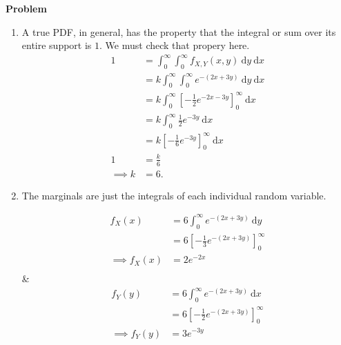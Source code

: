 \documentclass[12pt]{article}
\newenvironment{Ex}{\textbf{Problem}\vspace{.75em}\\}{}
\newcommand{\dd}[1]{\:\mathrm{d}{#1}}
\begin{document}
\begin{enumerate}
\begin{Ex}
\begin{solution}
      \begin{enumerate}
      \item A true PDF, in general, has the property that the
        integral or sum over its entire support is $1$. We must
        check that propery here.
        \begin{equation}
          \label{eq:6a-sol}
          \begin{aligned}
            1 &= \int_0^\infty \int_0^\infty f_{X,Y}(x,y) \dd{y}
            \dd{x} \\
            &= k \int_0^\infty \int_0^\infty e^{-(2x+3y)} \dd{y}
            \dd{x} \\
            &= k \int_0^\infty
            \left[-\frac{1}{2}e^{-2x-3y}\right]_0^\infty
            \dd{x} \\
            &= k \int_0^\infty \frac{1}{2}e^{-3y} \dd{x} \\
            &= k \left[-\frac{1}{6}e^{-3y}\right]_0^\infty \dd{x} \\
            1 &= \frac{k}{6} \\
            \implies k &= 6.
          \end{aligned}
        \end{equation}
      \item The marginals are just the integrals of each individual
        random variable.
        \begin{multicols}{2}
          \begin{equation}
            \label{eq:5b-marginal-x}
            \begin{aligned}
              f_X(x) &= 6\int_0^\infty e^{-(2x+3y)} \dd{y} \\
              &= 6\left[-\frac{1}{3}e^{-(2x+3y)}\right]_0^\infty \\
              \implies f_X(x) &= 2e^{-2x} \\
            \end{aligned}
          \end{equation} &
          \begin{equation}
            \label{eq:5b-marginal-y}
            \begin{aligned}
              f_Y(y) &= 6\int_0^\infty e^{-(2x+3y)} \dd{x} \\
              &= 6\left[-\frac{1}{2}e^{-(2x+3y)}\right]_0^\infty \\
              \implies f_Y(y) &= 3e^{-3y} \\
            \end{aligned}
          \end{equation}

\end{multicols}
\end{enumerate}
\end{solution}
\end{Ex}
\end{enumerate}
\end{document}
